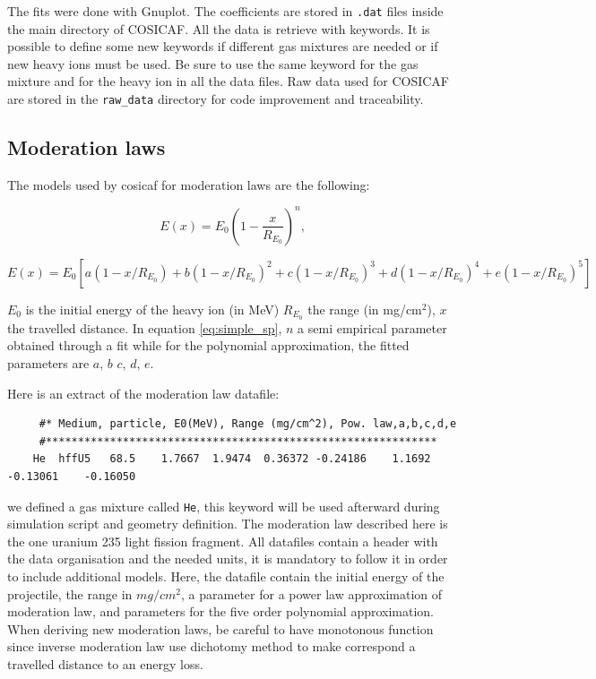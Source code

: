 \documentclass[10pt]{article}
\begin{document}
	The fits were done with Gnuplot. The coefficients are stored in \lstinline{.dat} files inside the main directory of COSICAF.
	All the data is retrieve with keywords. It is possible to define some new keywords if different gas mixtures are needed or if new heavy ions must be used. Be sure to use the same keyword for the gas mixture and for the heavy ion in all the data files. Raw data used for COSICAF are stored in the \lstinline{raw_data} directory for code improvement and traceability.
	
	\subsection{Moderation laws}
	The models used by cosicaf for moderation laws are the following:
	
	\begin{equation}
	E(x)=E_{0}\left(1-\frac{x}{R_{E_{0}}}\right)^{n},
	\label{eq:simple_sp}
	\end{equation}

	\begin{equation}
	E(x)=E_{0}\left[a\left(1-x/R_{E_0}\right)+b\left(1-x/R_{E_0}\right)^2+c\left(1-x/R_{E_0}\right)^3+d\left(1-x/R_{E_0}\right)^4+e\left(1-x/R_{E_0}\right)^5\right]
	\end{equation}
	
	$E_{0}$ is the initial energy of the heavy ion (in MeV) $R_{E_{0}}$ the range (in mg/cm$^{2}$), $x$ the travelled distance. In equation \ref{eq:simple_sp}, $n$ a semi empirical parameter obtained through a fit while for the polynomial approximation, the fitted  parameters are $a$, $b$ $c$, $d$, $e$.
	

	
	Here is an extract of the moderation law datafile:
	 
	 \begin{lstlisting}
	 #* Medium, particle, E0(MeV), Range (mg/cm^2), Pow. law,a,b,c,d,e
	 #*************************************************************
	He	hffU5	68.5	1.7667	1.9474	0.36372	-0.24186	1.1692	-0.13061	-0.16050
	 \end{lstlisting}
	 we defined a gas mixture called \lstinline{He}, this keyword will be used afterward during simulation script and geometry definition. The moderation law described here is the one uranium 235 light fission fragment.
	 All datafiles contain a header with the data organisation and the needed units, it is mandatory to follow it in order to include additional models. Here, the datafile contain the initial energy of the projectile, the range in $mg/cm^{2}$, a parameter for a power law  approximation of moderation law, and parameters for the five order polynomial approximation.
	 When deriving new moderation laws, be careful to have monotonous function since inverse moderation law use dichotomy method to make correspond a travelled distance to an energy loss.
	 
\end{document}
